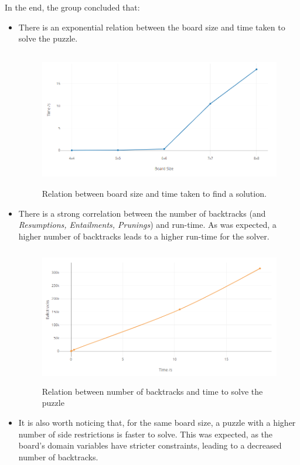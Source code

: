 \documentclass{llncs}
\begin{document}
In the end, the group concluded that:
\begin{itemize}
	\item There is an exponential relation between the board size and time taken to solve the puzzle.\\

\begin{figure}[h!]
\begin{center}
\includegraphics[height=6cm,width=12cm]{images/graph1.png}
\caption{Relation between board size and time taken to find a solution.}
\label{Figure 5}
\end{center}
\end{figure}

	\item There is a strong correlation between the number of backtracks (and \textit{Resumptions, Entailments, Prunings}) and run-time. As was expected, a higher number of backtracks leads to a higher run-time for the solver.\\

\begin{figure}[h!]
\begin{center}
\includegraphics[height=6cm,width=12cm]{images/graph2.png}
\caption{Relation between number of backtracks and time to solve the puzzle}
\label{Figure 6}
\end{center}
\end{figure}
	
	\item It is also worth noticing that, for the same board size, a puzzle with a higher number of side restrictions is faster to solve. This was expected, as the board's domain variables have stricter constraints, leading to a decreased number of backtracks.
\end{itemize}
\end{document}
